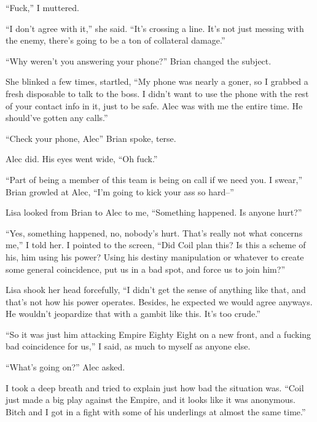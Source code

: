 ``Fuck,'' I muttered.



``I don't agree with it,'' she said.  ``It's crossing a line.  It's not just messing with the enemy, there's going to be a ton of collateral damage.''



``Why weren't you answering your phone?'' Brian changed the subject.



She blinked a few times, startled, ``My phone was nearly a goner, so I grabbed a fresh disposable to talk to the boss.  I didn't want to use the phone with the rest of your contact info in it, just to be safe.  Alec was with me the entire time.  He should've gotten any calls.''



``Check your phone, Alec'' Brian spoke, terse.



Alec did.  His eyes went wide, ``Oh fuck.''



``Part of being a member of this team is being on call if we need you.  I swear,'' Brian growled at Alec, ``I'm going to kick your ass so hard--''



Lisa looked from Brian to Alec to me, ``Something happened.  Is anyone hurt?''



``Yes, something happened, no, nobody's hurt.  That's really not what concerns me,'' I told her.  I pointed to the screen, ``Did Coil plan this?  Is this a scheme of his, him using his power?  Using his destiny manipulation or whatever to create some general coincidence, put us in a bad spot, and force us to join him?''



Lisa shook her head forcefully, ``I didn't get the sense of anything like that, and that's not how his power operates.  Besides, he expected we would agree anyways.  He wouldn't jeopardize that with a gambit like this.  It's too crude.''



``So it was just him attacking Empire Eighty Eight on a new front, and a fucking bad coincidence for us,'' I said, as much to myself as anyone else.



``What's going on?'' Alec asked.



I took a deep breath and tried to explain just how bad the situation was.  ``Coil just made a big play against the Empire, and it looks like it was anonymous.  Bitch and I got in a fight with some of his underlings at almost the same time.''



